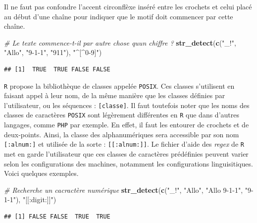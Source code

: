 \documentclass[
  11pt,
]{book}
\newenvironment{Shaded}{\begin{snugshade}}{\end{snugshade}}
\newcommand{\CommentTok}[1]{\textcolor[rgb]{0.56,0.35,0.01}{\textit{#1}}}
\newcommand{\KeywordTok}[1]{\textcolor[rgb]{0.13,0.29,0.53}{\textbf{#1}}}
\newcommand{\NormalTok}[1]{#1}
\newcommand{\StringTok}[1]{\textcolor[rgb]{0.31,0.60,0.02}{#1}}
\numberwithin{equation}{section}
\newcounter{countremarque}
\newenvironment{remarque}{%
 \refstepcounter{countremarque}
    \begin{tcolorbox}[width=\linewidth, colback=blue!3, boxrule=0.5pt,arc=0pt,title = Remarque \thecountremarque]
    }%
    {
    \end{tcolorbox}
    }
\numberwithin{countremarque}{section}
\begin{document}
\begin{remarque}
Il ne faut pas confondre l'accent circonflèxe inséré entre les crochets et celui placé au début d'une chaîne pour indiquer que le motif doit commencer par cette chaîne.
\end{remarque}

\begin{Shaded}
\begin{Highlighting}[]
\CommentTok{\# Le texte commence{-}t{-}il par autre chose qu\textquotesingle{}un chiffre ?}
\KeywordTok{str\_detect}\NormalTok{(}\KeywordTok{c}\NormalTok{(}\StringTok{"\_!"}\NormalTok{, }\StringTok{"Allo"}\NormalTok{, }\StringTok{"9{-}1{-}1"}\NormalTok{, }\StringTok{"911"}\NormalTok{), }\StringTok{"\^{}[\^{}0{-}9]"}\NormalTok{)}
\end{Highlighting}
\end{Shaded}

\begin{lstlisting}
## [1]  TRUE  TRUE FALSE FALSE
\end{lstlisting}

\texttt{R} propose la bibliothèque de classes appelée \texttt{POSIX}. Ces classes s'utilisent en faisant appel à leur nom, de la même manière que les classes définies par l'utilisateur, ou les séquences : \texttt{{[}classe{]}}. Il faut toutefois noter que les noms des classes de caractères \texttt{POSIX} sont légèrement différentes en \texttt{R} que dans d'autres langages, comme \texttt{PHP} par exemple. En effet, il faut les entourer de crochets et de deux-points. Ainsi, la classe des alphanumériques sera accessible par son nom \texttt{{[}:alnum:{]}} et utilisée de la sorte : \texttt{{[}{[}:alnum:{]}{]}}. Le fichier d'aide des \emph{regex} de \texttt{R} met en garde l'utilisateur que ces classes de caractères prédéfinies peuvent varier selon les configurations des machines, notamment les configurations linguisitiques. Voici quelques exemples.

\begin{Shaded}
\begin{Highlighting}[]
\CommentTok{\# Recherche un cacractère numérique}
\KeywordTok{str\_detect}\NormalTok{(}\KeywordTok{c}\NormalTok{(}\StringTok{"\_!"}\NormalTok{, }\StringTok{"Allo"}\NormalTok{, }\StringTok{"Allo 9{-}1{-}1"}\NormalTok{, }\StringTok{"9{-}1{-}1"}\NormalTok{), }\StringTok{"[[:digit:]]"}\NormalTok{)}
\end{Highlighting}
\end{Shaded}

\begin{lstlisting}
## [1] FALSE FALSE  TRUE  TRUE
\end{lstlisting}
\end{document}

